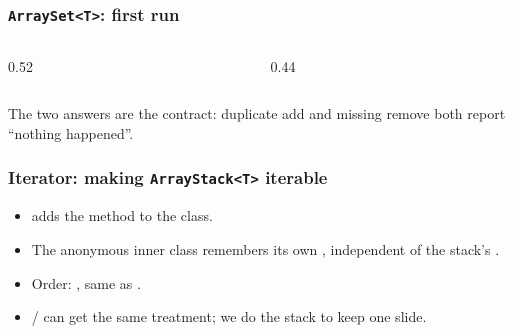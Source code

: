 \documentclass[aspectratio=169,10pt,compress]{beamer}
\begin{document}
\begin{frame}[t,fragile] \frametitle{\texttt{ArraySet<T>}: first run}
  \begin{columns}[T]
    \begin{column}{0.52\textwidth}
    \end{column}
    \begin{column}{0.44\textwidth}
    \end{column}
  \end{columns}
  \small
  The two  answers are the contract: duplicate add and
  missing remove both report ``nothing happened''.
\end{frame}





\begin{frame}[t,fragile] \frametitle{Iterator: making \texttt{ArrayStack<T>} iterable}
  \begin{itemize}\small
    \item {} adds the method
           to the class.
    \item The anonymous inner class remembers its own ,
          independent of the stack's .
    \item Order: , same as .
    \item {} /  can get the same treatment;
          we do the stack to keep one slide.
  \end{itemize}
\end{frame}
\end{document}
